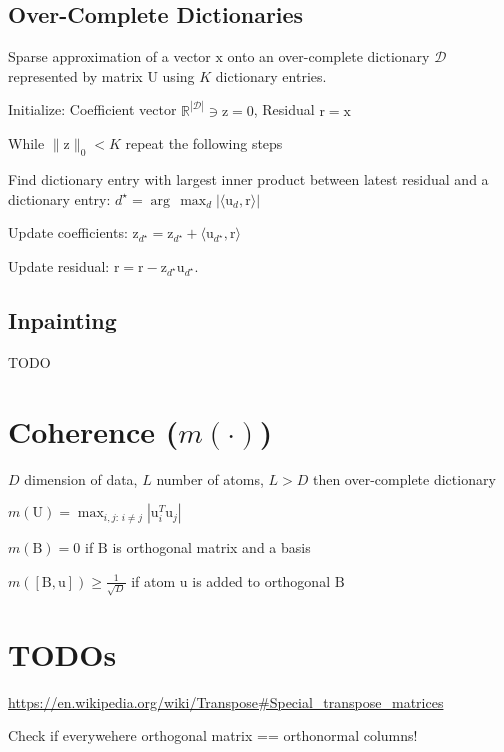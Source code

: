 \documentclass[a4paper, 11pt, landscape]{article}
\newcommand{\matr}[1]{\boldsymbol{\mathrm{#1}}}
\begin{document}
\begin{multicols*}{3}
\subsection{Over-Complete Dictionaries}
Sparse approximation of a vector $\matr{x}$ onto an over-complete dictionary $\mathcal{D}$ represented by matrix $\matr{U}$ using $K$ dictionary entries.
\begin{compactenum}
	\item Initialize: Coefficient vector $\mathbb{R}^{|\mathcal{D}|} \ni \matr{z} = \matr{0}$, Residual $\matr{r} = \matr{x}$
	\item While $\|\matr{z}\|_0 < K$ repeat the following steps
	\item Find dictionary entry with largest inner product between latest residual and a dictionary entry: $d^\star = \arg\,\max_d |\langle \matr{u}_d, \matr{r} \rangle|$
	\item Update coefficients: $\matr{z}_{d^\star} = \matr{z}_{d^\star} + \langle \matr{u}_{d^\star}, \matr{r} \rangle$
	\item Update residual: $\matr{r} = \matr{r} - \matr{z}_{d^\star} \matr{u}_{d^\star}$.
\end{compactenum}

\subsection{Inpainting}
TODO

\section{Coherence ($m(\cdot)$)}
\begin{compactitem}
	\item $D$ dimension of data, $L$ number of atoms, $L > D$ then over-complete dictionary
	\item $m(\matr{U}) = \max_{i,j:\, i \neq j} | \matr{u}_i^T \matr{u}_j |$
	\item $m(\matr{B}) = 0$ if $\matr{B}$ is orthogonal matrix and a basis
	\item $m([\matr{B}, \matr{u}]) \geq \frac{1}{\sqrt{D}}$ if atom $\matr{u}$ is added to orthogonal $\matr{B}$
\end{compactitem}


\section{TODOs}
\url{https://en.wikipedia.org/wiki/Transpose#Special_transpose_matrices}

Check if everywehere orthogonal matrix == orthonormal columns!



\raggedcolumns
\end{multicols*}
\end{document}
